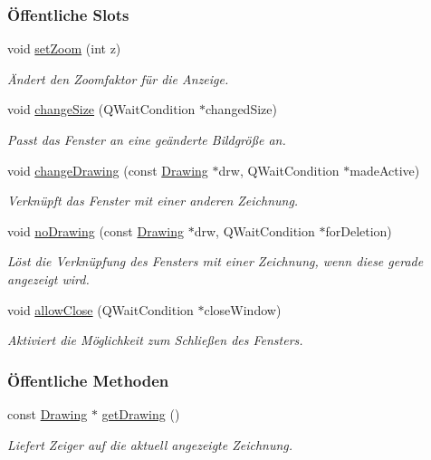 \subsubsection*{Öffentliche Slots}
\begin{DoxyCompactItemize}
\item 
void \mbox{\hyperlink{classDrawWindow_af504bbe367340f6318003b116f575e29}{set\+Zoom}} (int z)
\begin{DoxyCompactList}\small\item\em Ändert den Zoomfaktor für die Anzeige. \end{DoxyCompactList}\item 
void \mbox{\hyperlink{classDrawWindow_a5f1d223501d8cc95ec5b54b3e8438559}{change\+Size}} (Q\+Wait\+Condition $\ast$changed\+Size)
\begin{DoxyCompactList}\small\item\em Passt das Fenster an eine geänderte Bildgröße an. \end{DoxyCompactList}\item 
void \mbox{\hyperlink{classDrawWindow_a38c094c0d774830ee22b827a4e7e3f31}{change\+Drawing}} (const \mbox{\hyperlink{classDrawing}{Drawing}} $\ast$drw, Q\+Wait\+Condition $\ast$made\+Active)
\begin{DoxyCompactList}\small\item\em Verknüpft das Fenster mit einer anderen Zeichnung. \end{DoxyCompactList}\item 
void \mbox{\hyperlink{classDrawWindow_a11ecf08241e0a34806dba95321b4590d}{no\+Drawing}} (const \mbox{\hyperlink{classDrawing}{Drawing}} $\ast$drw, Q\+Wait\+Condition $\ast$for\+Deletion)
\begin{DoxyCompactList}\small\item\em Löst die Verknüpfung des Fensters mit einer Zeichnung, wenn diese gerade angezeigt wird. \end{DoxyCompactList}\item 
void \mbox{\hyperlink{classDrawWindow_ab7934ccfbfba2c54c9837fdd5aaec4ea}{allow\+Close}} (Q\+Wait\+Condition $\ast$close\+Window)
\begin{DoxyCompactList}\small\item\em Aktiviert die Möglichkeit zum Schließen des Fensters. \end{DoxyCompactList}\end{DoxyCompactItemize}
\subsubsection*{Öffentliche Methoden}
\begin{DoxyCompactItemize}
\item 
const \mbox{\hyperlink{classDrawing}{Drawing}} $\ast$ \mbox{\hyperlink{classDrawWindow_ab37002c26d9f063023c937f6abf00b1b}{get\+Drawing}} ()
\begin{DoxyCompactList}\small\item\em Liefert Zeiger auf die aktuell angezeigte Zeichnung. \end{DoxyCompactList}\end{DoxyCompactItemize}
